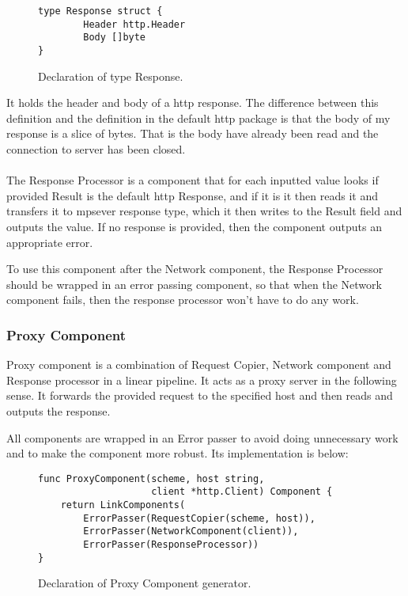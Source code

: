 \documentclass[12pt,a4paper]{article}
\begin{document}
\begin{figure}[h]
\centering
\begin{lstlisting}
type Response struct {
		Header http.Header
		Body []byte
}
\end{lstlisting}
\caption[scale=1.0]{Declaration of type Response.}
\label{fig:Response}
\end{figure}

It holds the header and body of a http response. The difference between
this definition and the definition in the default http package is that
the body of my response is a slice of bytes. That is the body have already been
read and the connection to server has been closed.
\\
\\
The Response Processor is a component that for each inputted value
looks if provided Result is the default http Response, and if it is
it then reads it and transfers it to mpsever response type, which it
then writes to the Result field and outputs the value. If no response
is provided, then the component outputs an appropriate error.

To use this component after the Network component, the Response Processor
should be wrapped in an error passing component, so that when the 
Network component fails, then the response processor won't have to do
any work.

\subsubsection{Proxy Component}
Proxy component is a combination of Request Copier, Network component 
and Response processor in a linear pipeline. It acts as a proxy server
in the following sense. It forwards the provided request to the specified
host and then reads and outputs the response. 

All components are wrapped
in an Error passer to avoid doing unnecessary work and to make the component
more robust. Its implementation is below:

\begin{figure}[h]
\centering
\begin{lstlisting}
func ProxyComponent(scheme, host string, 
					client *http.Client) Component {
	return LinkComponents(
		ErrorPasser(RequestCopier(scheme, host)),
		ErrorPasser(NetworkComponent(client)),
		ErrorPasser(ResponseProcessor))
}
\end{lstlisting}
\caption[scale=1.0]{Declaration of Proxy Component generator.}
\label{fig:ProxyComp}
\end{figure}
\end{document}
